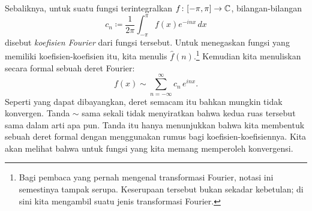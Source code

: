 \medskip

Sebaliknya, untuk suatu fungsi terintegralkan $f \colon [-\pi,\pi] \to
{\mathbb{C}}$, bilangan-bilangan
\begin{equation*}
c_n \coloneqq 
\frac{1}{2\pi} \int_{-\pi}^\pi
f(x) e^{-inx} \, dx
\end{equation*}
disebut \emph{koefisien Fourier} dari fungsi tersebut. Untuk menegaskan fungsi
yang memiliki koefisien-koefisien itu,
kita menulis $\hat{f}(n)$.\footnote{Bagi pembaca yang pernah mengenal
transformasi Fourier, notasi ini semestinya tampak serupa.
Keserupaan tersebut bukan sekadar
kebetulan; di sini kita mengambil suatu jenis transformasi Fourier.}
Kemudian kita menuliskan secara formal sebuah deret Fourier:
\begin{equation*}
f(x) \sim
\sum_{n=-\infty}^\infty c_n \, e^{inx} .
\end{equation*}
Seperti yang dapat dibayangkan, deret semacam itu bahkan mungkin tidak konvergen.
Tanda $\sim$ sama sekali tidak menyiratkan bahwa kedua ruas tersebut sama
dalam arti apa pun. Tanda itu hanya menunjukkan bahwa kita membentuk sebuah deret formal dengan menggunakan rumus
bagi koefisien-koefisiennya. Kita akan melihat bahwa untuk fungsi yang
 kita memang memperoleh konvergensi.

